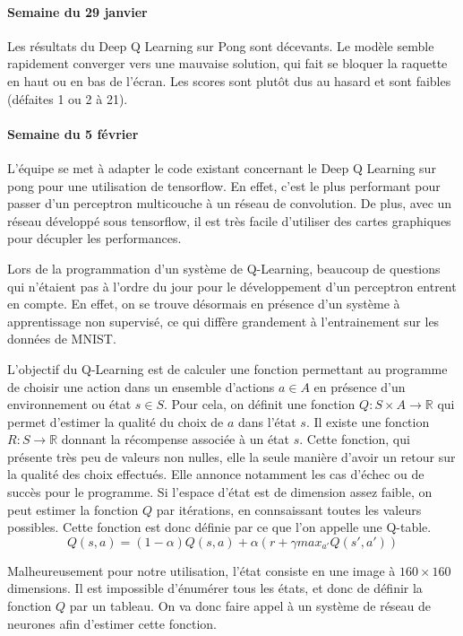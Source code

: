 \documentclass[
    10pt,
    a4paper,
    oneside,
    headinclude,footinclude,
    BCOR=5mm,
    captions=tableabove
]{scrartcl}
\begin{document}
\paragraph{Semaine du 29 janvier}

Les résultats du Deep Q Learning sur Pong sont décevants. Le modèle semble rapidement converger vers une mauvaise solution, qui fait se bloquer la raquette en haut ou en bas de l'écran. Les scores sont plutôt dus au hasard et sont faibles (défaites 1 ou 2 à 21).

\paragraph{Semaine du 5 février}

L'équipe se met à adapter le code existant concernant le Deep Q Learning sur pong pour une utilisation de tensorflow. En effet, c'est le plus performant pour passer d'un perceptron multicouche à un réseau de convolution. De plus, avec un réseau développé sous tensorflow, il est très facile d'utiliser des cartes graphiques pour décupler les performances.

Lors de la programmation d'un système de Q-Learning, beaucoup de questions qui n'étaient pas à l'ordre du jour pour le développement d'un perceptron entrent en compte. En effet, on se trouve désormais en présence d'un système à apprentissage non supervisé, ce qui diffère grandement à l'entrainement sur les données de MNIST.

L'objectif du Q-Learning est de calculer une fonction permettant au programme de choisir une action dans un ensemble d'actions $a \in A$ en présence d'un environnement ou état $s \in S$. Pour cela, on définit une fonction $Q: S \times A \rightarrow \mathbb{R}$ qui permet d'estimer la qualité du choix de $a$ dans l'état $s$. Il existe une fonction $R: S \rightarrow \mathbb{R}$ donnant la récompense associée à un état $s$. Cette fonction, qui présente très peu de valeurs non nulles, elle la seule manière d'avoir un retour sur la qualité des choix effectués. Elle annonce notamment les cas d'échec ou de succès pour le programme. Si l'espace d'état est de dimension assez faible, on peut estimer la fonction $Q$ par itérations, en connsaissant toutes les valeurs possibles. Cette fonction est donc définie par ce que l'on appelle une Q-table.
 $$Q(s,a) = (1-\alpha) Q(s,a) + \alpha (r + \gamma max_{a'} Q(s',a') )$$

Malheureusement pour notre utilisation, l'état consiste en une image à $160 \times 160$ dimensions. Il est impossible d'énumérer tous les états, et donc de définir la fonction $Q$ par un tableau. On va donc faire appel à un système de réseau de neurones afin d'estimer cette fonction.

\renewcommand{\refname}{\spacedlowsmallcaps{References}} %

\end{document}
